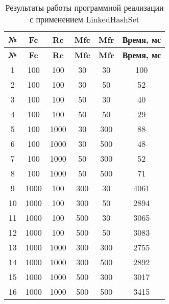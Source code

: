 \begin{longtable}{|c|c|c|c|c|c|}
    \caption{Результаты работы программной реализации с применением LinkedHashSet}
    \label{tab:linkedhashset}\\
    \hline
    \bfseries{№} & \bfseries{Fc} & \bfseries{Rc} & \bfseries{Mfc} & \bfseries{Mfr} & \bfseries{Время, мс} \\
    \hline
    \endfirsthead
    \hline
    \bfseries{№} & \bfseries{Fc} & \bfseries{Rc} & \bfseries{Mfc} & \bfseries{Mfr} & \bfseries{Время, мс} \\
    \hline
    \endhead
    \hline
    1 & 100 & 100 & 30 & 30 & 100 \\
    \hline
    2 & 100 & 100 & 30 & 50 & 52 \\
    \hline
    3 & 100 & 100 & 50 & 30 & 40 \\
    \hline
    4 & 100 & 100 & 50 & 50 & 29 \\
    \hline
    5 & 100 & 1000 & 30 & 300 & 88 \\
    \hline
    6 & 100 & 1000 & 30 & 500 & 48 \\
    \hline
    7 & 100 & 1000 & 50 & 300 & 52 \\
    \hline
    8 & 100 & 1000 & 50 & 500 & 71 \\
    \hline
    9 & 1000 & 100 & 300 & 30 & 4061 \\
    \hline
    10 & 1000 & 100 & 300 & 50 & 2894 \\
    \hline
    11 & 1000 & 100 & 500 & 30 & 3065 \\
    \hline
    12 & 1000 & 100 & 500 & 50 & 3083 \\
    \hline
    13 & 1000 & 1000 & 300 & 300 & 2755 \\
    \hline
    14 & 1000 & 1000 & 300 & 500 & 2892 \\
    \hline
    15 & 1000 & 1000 & 500 & 300 & 3017 \\
    \hline
    16 & 1000 & 1000 & 500 & 500 & 3415 \\
    \hline
\end{longtable}

